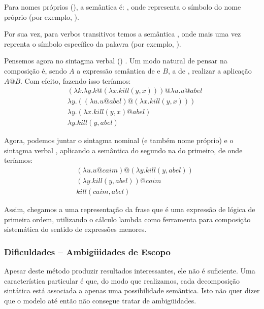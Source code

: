 Para nomes próprios (), a semântica é: , onde  representa o símbolo do nome próprio (por exemplo, ).

Por sua vez, para verbos transitivos temos a semântica , onde mais uma vez  reprenta o símbolo específico da palavra (por exemplo, ).

Pensemos agora no sintagma verbal () . Um modo natural de pensar na composição é, sendo $A$ a expressão semântica de  e $B$, a de , realizar a aplicação $A@B$. Com efeito, fazendo isso teríamos:
\begin{align*}
&(\lambda k. \lambda y. k@(\lambda x. kill(y,x))) @ \lambda u. u@abel \\
& \lambda y. ((\lambda u. u@abel)@(\lambda x. kill(y,x))) \\
& \lambda y. (\lambda x.kill(y,x)@abel) \\
& \lambda y. kill(y,abel)
\end{align*}

Agora, podemos juntar o sintagma nominal (e também nome próprio)  e o sintagma verbal , aplicando a semântica do segundo na do primeiro, de onde teríamos:
\begin{align*}
&(\lambda u. u@caim)@(\lambda y.kill(y,abel)) \\
& (\lambda y. kill(y,abel))@caim \\
& kill(caim,abel)
\end{align*}

Assim, chegamos a uma representação da frase  que é uma expressão de lógica de primeira ordem, utilizando o cálculo lambda como ferramenta para composição sistemática do sentido de expressões menores.

\subsubsection{Dificuldades -- Ambigüidades de Escopo}
Apesar deste método produzir resultados interessantes, ele não é suficiente. Uma característica particular é que, do modo que realizamos, cada decomposição sintática está associada a apenas uma possibilidade semântica. Isto não quer dizer que o modelo até então não consegue tratar de ambigüidades.

